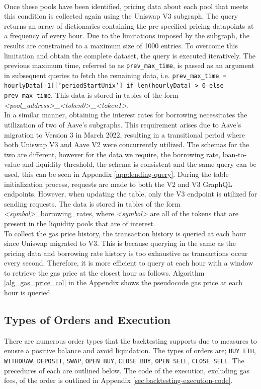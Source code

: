 \\[3mm]
Once these pools have been identified, pricing data about each pool that meets this condition is collected again using the Uniswap V3 subgraph. The query returns an array of dictionaries containing the pre-specified pricing datapoints at a frequency of every hour. Due to the limitations imposed by the subgraph, the results are constrained to a maximum size of 1000 entries. To overcome this limitation and obtain the complete dataset, the query is executed iteratively. The previous maximum time, referred to as \texttt{prev\_max\_time}, is passed as an argument in subsequent queries to fetch the remaining data, i.e. \texttt{prev\_max\_time = hourlyData[-1]['periodStartUnix'] if len(hourlyData) > 0 else prev\_max\_time}. This data is stored in tables of the form \textit{<pool\_address>}\_\textit{<token0>}\_\textit{<token1>}.
\\[3mm]
In a similar manner, obtaining the interest rates for borrowing necessitates the utilization of two of Aave's subgraphs. This requirement arises due to Aave's migration to Version 3 in March 2022, resulting in a transitional period where both Uniswap V3 and Aave V2 were concurrently utilized. The schemas for the two are different, however for the data we require, the borrowing rate, loan-to-value and liquidity threshold, the schema is consistent and the same query can be used, this can be seen in Appendix \ref{app:lending-query}. During the table initialization process, requests are made to both the V2 and V3 GraphQL endpoints. However, when updating the table, only the V3 endpoint is utilized for sending requests. The data is stored in tables of the form \textit{<symbol>}\_borrowing\_rates, where \textit{<symbol>} are all of the tokens that are present in the liquidity pools that are of interest.
\\[3mm]
To collect the gas price history, the transaction history is queried at each hour since Uniswap migrated to V3. This is because querying in the same as the pricing data and borrowing rate history is too exhaustive as transactions occur every second. Therefore, it is more efficient to query at each hour with a window to retrieve the gas price at the closest hour as follows. Algorithm \ref{alg_gas_price_col} in the Appendix shows the pseudocode gas price at each hour is queried. 
\subsection{Types of Orders and Execution}
There are numerous order types that the backtesting supports due to measures to enusre a positive balance and avoid liquidation. The types of orders are; \texttt{BUY\ ETH}, \texttt{WITHDRAW}, \texttt{DEPOSIT}, \texttt{SWAP}, \texttt{OPEN\ BUY}, \texttt{CLOSE\ BUY}, \texttt{OPEN\ SELL}, \texttt{CLOSE\ SELL}. The precedures of each are outlined below.  The code of the execution, excluding gas fees, of the order is outlined in Appendix \ref{sec:backtesting-execution-code}.

